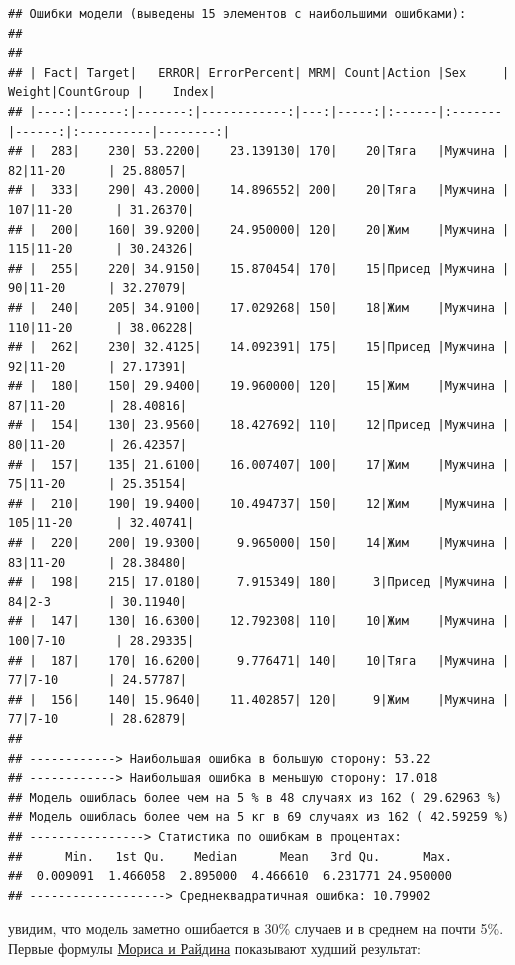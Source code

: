 \documentclass[
]{article}
\begin{document}
\begin{verbatim}
## Ошибки модели (выведены 15 элементов с наибольшими ошибками): 
## 
## 
## | Fact| Target|   ERROR| ErrorPercent| MRM| Count|Action |Sex     | Weight|CountGroup |    Index|
## |----:|------:|-------:|------------:|---:|-----:|:------|:-------|------:|:----------|--------:|
## |  283|    230| 53.2200|    23.139130| 170|    20|Тяга   |Мужчина |     82|11-20      | 25.88057|
## |  333|    290| 43.2000|    14.896552| 200|    20|Тяга   |Мужчина |    107|11-20      | 31.26370|
## |  200|    160| 39.9200|    24.950000| 120|    20|Жим    |Мужчина |    115|11-20      | 30.24326|
## |  255|    220| 34.9150|    15.870454| 170|    15|Присед |Мужчина |     90|11-20      | 32.27079|
## |  240|    205| 34.9100|    17.029268| 150|    18|Жим    |Мужчина |    110|11-20      | 38.06228|
## |  262|    230| 32.4125|    14.092391| 175|    15|Присед |Мужчина |     92|11-20      | 27.17391|
## |  180|    150| 29.9400|    19.960000| 120|    15|Жим    |Мужчина |     87|11-20      | 28.40816|
## |  154|    130| 23.9560|    18.427692| 110|    12|Присед |Мужчина |     80|11-20      | 26.42357|
## |  157|    135| 21.6100|    16.007407| 100|    17|Жим    |Мужчина |     75|11-20      | 25.35154|
## |  210|    190| 19.9400|    10.494737| 150|    12|Жим    |Мужчина |    105|11-20      | 32.40741|
## |  220|    200| 19.9300|     9.965000| 150|    14|Жим    |Мужчина |     83|11-20      | 28.38480|
## |  198|    215| 17.0180|     7.915349| 180|     3|Присед |Мужчина |     84|2-3        | 30.11940|
## |  147|    130| 16.6300|    12.792308| 110|    10|Жим    |Мужчина |    100|7-10       | 28.29335|
## |  187|    170| 16.6200|     9.776471| 140|    10|Тяга   |Мужчина |     77|7-10       | 24.57787|
## |  156|    140| 15.9640|    11.402857| 120|     9|Жим    |Мужчина |     77|7-10       | 28.62879|
## 
## ------------> Наибольшая ошибка в большую сторону: 53.22 
## ------------> Наибольшая ошибка в меньшую сторону: 17.018 
## Модель ошиблась более чем на 5 % в 48 случаях из 162 ( 29.62963 %)
## Модель ошиблась более чем на 5 кг в 69 случаях из 162 ( 42.59259 %)
## ----------------> Статистика по ошибкам в процентах:
##      Min.   1st Qu.    Median      Mean   3rd Qu.      Max. 
##  0.009091  1.466058  2.895000  4.466610  6.231771 24.950000 
## -------------------> Среднеквадратичная ошибка: 10.79902
\end{verbatim}

увидим, что модель заметно ошибается в 30\% случаев и в среднем на почти
5\%. Первые формулы
\href{https://power-fitness.ru/metod-morisa-i-rajdina-ili-kak-uznat-svoj-maksimum-v-zhime-lezha.html}{Мориса
и Райдина} показывают худший результат:
\end{document}
